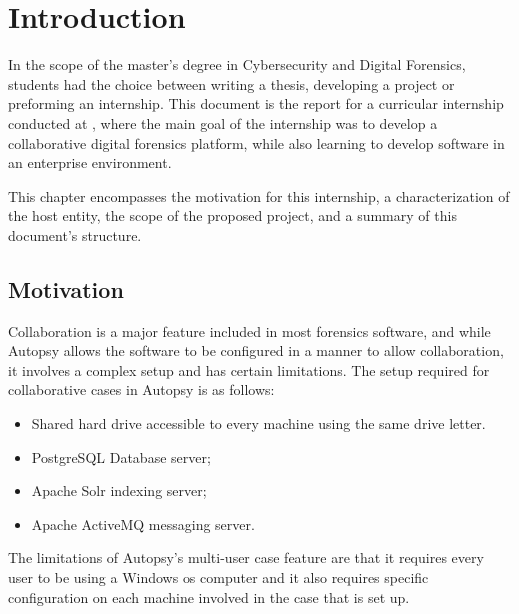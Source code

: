 
\chapter{Introduction}
\label{ch:introduction}

In the scope of the master's degree in Cybersecurity and Digital Forensics, students had the choice between writing a thesis, developing a project or preforming an internship.
This document is the report for a curricular internship conducted at \company \cite{void}, where the main goal of the internship was to develop a collaborative digital forensics platform,
while also learning to develop software in an enterprise environment.

This chapter encompasses the motivation for this internship, a characterization of the host entity, the scope of the proposed project, and a summary of this document's structure.

\section{Motivation}

Collaboration is a major feature included in most forensics software, and while Autopsy \cite{autopsy} allows the software to be
configured in a manner to allow collaboration, it involves a complex setup and has certain limitations.
The setup required for collaborative cases in Autopsy is as follows:
\begin{itemize}
 \item Shared hard drive accessible to every machine using the same drive letter.
 \item PostgreSQL \cite{postgresql} Database server;
 \item Apache Solr \cite{solr} indexing server;
 \item Apache ActiveMQ \cite{activemq} messaging server.
\end{itemize}

The limitations of Autopsy's multi-user case feature are that it requires every user to be using a Windows \cite{windows} \acrfull{os} computer and it also requires specific configuration on each
machine involved in the case that is set up.

